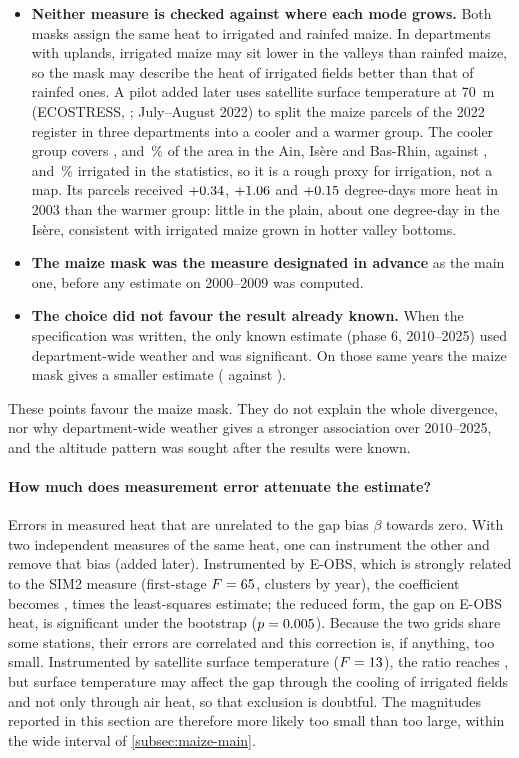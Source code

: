 \begin{itemize}
  \item \textbf{Neither measure is checked against where each mode grows.} Both masks assign the same heat to irrigated and rainfed maize. In departments with uplands, irrigated maize may sit lower in the valleys than rainfed maize, so the mask may describe the heat of irrigated fields better than that of rainfed ones. A pilot added later uses satellite surface temperature at 70~m (ECOSTRESS, \cite{hook2022}; July--August 2022) to split the maize parcels of the 2022 register in three departments into a cooler and a warmer group. The cooler group covers \EcoShareAin, \EcoShareIsere{} and \EcoShareBasRhin\,\% of the area in the Ain, Isère and Bas-Rhin, against \EcoSaaAin, \EcoSaaIsere{} and \EcoSaaBasRhin\,\% irrigated in the statistics, so it is a rough proxy for irrigation, not a map. Its parcels received $+0.34$, $+1.06$ and $+0.15$ degree-days more heat in 2003 than the warmer group: little in the plain, about one degree-day in the Isère, consistent with irrigated maize grown in hotter valley bottoms.
  \item \textbf{The maize mask was the measure designated in advance} as the main one, before any estimate on 2000--2009 was computed.
  \item \textbf{The choice did not favour the result already known.} When the specification was written, the only known estimate (phase 6, 2010--2025) used department-wide weather and was significant. On those same years the maize mask gives a smaller estimate (\MaskRecent{} against \AreaRecent).
\end{itemize}
These points favour the maize mask. They do not explain the whole divergence, nor why department-wide weather gives a stronger association over 2010--2025, and the altitude pattern was sought after the results were known.

\paragraph{How much does measurement error attenuate the estimate?} Errors in measured heat that are unrelated to the gap bias $\beta$ towards zero. With two independent measures of the same heat, one can instrument the other and remove that bias (added later). Instrumented by E-OBS, which is strongly related to the SIM2 measure (first-stage $F = 65$, clusters by year), the coefficient becomes \IvEobsBeta, \IvEobsRatio{} times the least-squares estimate; the reduced form, the gap on E-OBS heat, is significant under the bootstrap ($p = 0.005$). Because the two grids share some stations, their errors are correlated and this correction is, if anything, too small. Instrumented by satellite surface temperature ($F = 13$), the ratio reaches \IvLstRatio, but surface temperature may affect the gap through the cooling of irrigated fields and not only through air heat, so that exclusion is doubtful. The magnitudes reported in this section are therefore more likely too small than too large, within the wide interval of \cref{subsec:maize-main}.

